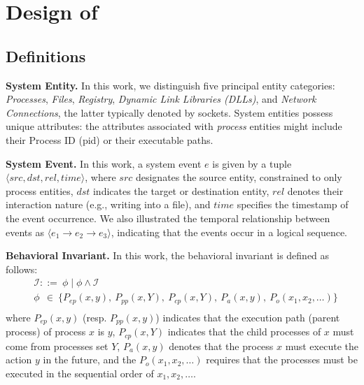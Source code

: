 \section{Design of \tool}

\subsection{Definitions}\label{sec:toolDefs}
\noindent
{\bf System Entity.} In this work, we distinguish five principal entity categories: \textit{Processes}, \textit{Files}, \textit{Registry}, \textit{Dynamic Link Libraries (DLLs)}, and \textit{Network Connections}, the latter typically denoted by sockets. System entities possess unique attributes: the attributes associated with \textit{process} entities might include their Process ID (pid) or their executable paths. 

\noindent
{\bf System Event.} In this work, a system event $e$ is given by a tuple $\langle src, dst, rel, time\rangle$, where $src$ designates the source entity, constrained to only process entities, $dst$ indicates the target or destination entity, $rel$ denotes their interaction nature (e.g., writing into a file), and $time$ specifies the timestamp of the event occurrence.
We also illustrated the temporal relationship between events as $\langle e_1 \to e_2 \to e_3 \rangle$, indicating that the events occur in a logical sequence. 


\noindent
{\bf Behavioral Invariant.} In this work, the behavioral invariant is defined as follows:
\begin{align*}
 & \mathcal{I}  ::= \ \phi \mid \phi \wedge \mathcal{I} \\
 & \phi  \ \ \in \ \{ P_{ep}(x,y), \ P_{pp}(x,Y), \ P_{cp}(x,Y), \ P_{a}(x,y), \ P_{o}(x_1,x_2,\ldots)\} \\
\end{align*}
where $P_{ep}(x,y)$ (resp. $P_{pp}(x,y)$) indicates that the execution path (parent process) of process $x$ is $y$, $P_{cp}(x, Y)$ indicates that the child processes of $x$ must come from processes set $Y$, $P_{a}(x,y)$ denotes that the process $x$ must execute the action $y$ in the future, and the $P_{o}(x_1,x_2,\ldots)$ requires that the processes must be executed in the sequential order of $x_1,x_2,\ldots$.

